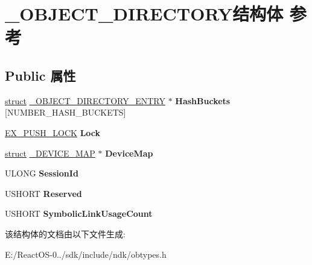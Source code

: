 \hypertarget{struct___o_b_j_e_c_t___d_i_r_e_c_t_o_r_y}{}\section{\+\_\+\+O\+B\+J\+E\+C\+T\+\_\+\+D\+I\+R\+E\+C\+T\+O\+R\+Y结构体 参考}
\label{struct___o_b_j_e_c_t___d_i_r_e_c_t_o_r_y}
\subsection*{Public 属性}
\begin{DoxyCompactItemize}
\item 
\mbox{\label{struct___o_b_j_e_c_t___d_i_r_e_c_t_o_r_y_a77a0c8d77233e36a454c3dc2e58ebfdb}} 
\hyperlink{interfacestruct}{struct} \hyperlink{struct___o_b_j_e_c_t___d_i_r_e_c_t_o_r_y___e_n_t_r_y}{\+\_\+\+O\+B\+J\+E\+C\+T\+\_\+\+D\+I\+R\+E\+C\+T\+O\+R\+Y\+\_\+\+E\+N\+T\+RY} $\ast$ {\bfseries Hash\+Buckets} \mbox{[}N\+U\+M\+B\+E\+R\+\_\+\+H\+A\+S\+H\+\_\+\+B\+U\+C\+K\+E\+TS\mbox{]}
\item 
\mbox{\label{struct___o_b_j_e_c_t___d_i_r_e_c_t_o_r_y_aebec81813666bc363f60a6e4f72af0f1}} 
\hyperlink{struct___e_x___p_u_s_h___l_o_c_k}{E\+X\+\_\+\+P\+U\+S\+H\+\_\+\+L\+O\+CK} {\bfseries Lock}
\item 
\mbox{\label{struct___o_b_j_e_c_t___d_i_r_e_c_t_o_r_y_a38aa5f3f88d98aec3b67f0b9b9764852}} 
\hyperlink{interfacestruct}{struct} \hyperlink{struct___d_e_v_i_c_e___m_a_p}{\+\_\+\+D\+E\+V\+I\+C\+E\+\_\+\+M\+AP} $\ast$ {\bfseries Device\+Map}
\item 
\mbox{\label{struct___o_b_j_e_c_t___d_i_r_e_c_t_o_r_y_a6940c65b7420003056c225952ea2c148}} 
U\+L\+O\+NG {\bfseries Session\+Id}
\item 
\mbox{\label{struct___o_b_j_e_c_t___d_i_r_e_c_t_o_r_y_a90701a9d16f60867b243d5e7f0539d31}} 
U\+S\+H\+O\+RT {\bfseries Reserved}
\item 
\mbox{\label{struct___o_b_j_e_c_t___d_i_r_e_c_t_o_r_y_a5982ccf16735f2b19ba1f959b5c972a8}} 
U\+S\+H\+O\+RT {\bfseries Symbolic\+Link\+Usage\+Count}
\end{DoxyCompactItemize}


该结构体的文档由以下文件生成\+:\begin{DoxyCompactItemize}
\item 
E\+:/\+React\+O\+S-\/0../sdk/include/ndk/obtypes.\+h\end{DoxyCompactItemize}
